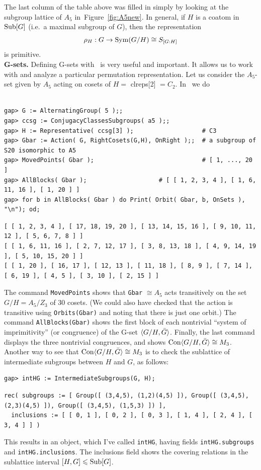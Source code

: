 The last column of the table above was filled in simply 
by looking at the subgroup lattice of $A_5$ in~Figure~\ref{fig:A5new}.  
In general, if $H$ is a coatom in $\mathrm{Sub}[G]$ (i.e.~a maximal subgroup of $G$),
then the representation  
\[
\rho_{H} : G \rightarrow \mathrm{Sym}(G/H) \cong S_{[G:H]}
\] is primitive.
\\[10pt]
{\bf G-sets.} Defining G-sets with \gap\ is very useful and important.  It allows us to work
with and analyze a particular permutation representation.  Let us consider the
$A_5$-set given by $A_5$ acting on cosets of $H=$ {clreps[2]} $=C_2$. In \gap\
we do
{\codesize 
\begin{verbatim}

gap> G := AlternatingGroup( 5 );;
gap> ccsg := ConjugacyClassesSubgroups( a5 );;
gap> H := Representative( ccsg[3] );                   # C3
gap> Gbar := Action( G, RightCosets(G,H), OnRight );;  # a subgroup of S20 isomorphic to A5
gap> MovedPoints( Gbar );                              # [ 1, ..., 20 ]
gap> AllBlocks( Gbar );                    # [ [ 1, 2, 3, 4 ], [ 1, 6, 11, 16 ], [ 1, 20 ] ]
gap> for b in AllBlocks( Gbar ) do Print( Orbit( Gbar, b, OnSets ), "\n"); od;
\end{verbatim}}
{\scriptsize 
\begin{verbatim}
[ [ 1, 2, 3, 4 ], [ 17, 18, 19, 20 ], [ 13, 14, 15, 16 ], [ 9, 10, 11, 12 ], [ 5, 6, 7, 8 ] ]
[ [ 1, 6, 11, 16 ], [ 2, 7, 12, 17 ], [ 3, 8, 13, 18 ], [ 4, 9, 14, 19 ], [ 5, 10, 15, 20 ] ]
[ [ 1, 20 ], [ 16, 17 ], [ 12, 13 ], [ 11, 18 ], [ 8, 9 ], [ 7, 14 ], [ 6, 19 ], [ 4, 5 ], [ 3, 10 ], [ 2, 15 ] ]

\end{verbatim}}
\noindent The command {\tt MovedPoints} shows that {\tt Gbar} $\cong A_5$ acts transitively on the set
$G/H = A_5/Z_3$ of 30 cosets.  (We could also have checked that the action is transitive
using {\tt Orbits(Gbar)} and noting that there is just one orbit.)
The command {\tt AllBlocks(Gbar)} shows 
the first block of each nontrivial ``system of imprimitivity'' (or congruence) of
the G-set $\langle G/H, \bar{G}\rangle$.  Finally, the last command displays the three
nontrivial congruences, and shows $\mathrm{Con} \langle G/H, \bar{G}\rangle\cong M_3$.  Another way
to see that  $\mathrm{Con} \langle G/H, \bar{G}\rangle\cong M_3$ is to check the sublattice of
intermediate subgroups between $H$ and $G$, as follows:
{\codesize 
\begin{verbatim}
gap> intHG := IntermediateSubgroups(G, H);
\end{verbatim}}
{\scriptsize 
\begin{verbatim}
rec( subgroups := [ Group([ (3,4,5), (1,2)(4,5) ]), Group([ (3,4,5), (2,3)(4,5) ]), Group([ (3,4,5), (1,5,3) ]) ], 
  inclusions := [ [ 0, 1 ], [ 0, 2 ], [ 0, 3 ], [ 1, 4 ], [ 2, 4 ], [ 3, 4 ] ] )
\end{verbatim}}
\noindent This results in an object, which I've called {\tt intHG}, having fields
{\tt intHG.subgroups} and {\tt intHG.inclusions}.  The inclusions field shows
the covering relations in the sublattice interval $[H, G] \leqslant \mathrm{Sub}[G]$.

